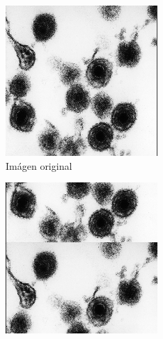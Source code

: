 \documentclass{uc3mpracticas}
\begin{document}
  \begin{figure}[!h]
    \centering
    \begin{subfigure}[b]{0.18\textwidth}
      \includegraphics[width=\textwidth, frame]{Images/og.png}
      \caption{Imágen original}
    \end{subfigure}
    \hfill
    \begin{subfigure}[b]{0.18\textwidth}
      \includegraphics[width=\textwidth, frame]{Images/trasAbj.png}

\end{subfigure}
\end{figure}
\end{document}
